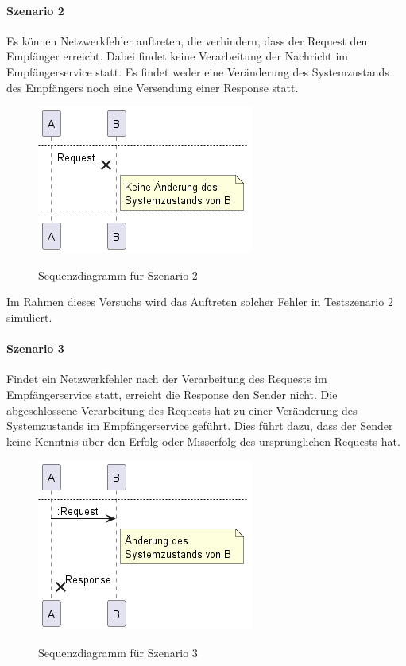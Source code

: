 \paragraph*{Szenario 2}
Es können Netzwerkfehler auftreten, die verhindern, dass der Request den Empfänger erreicht. Dabei findet keine Verarbeitung der Nachricht im Empfängerservice statt. Es findet weder eine Veränderung des Systemzustands des Empfängers noch eine Versendung einer Response statt.

\begin{figure}[H]
	\centering
	\includegraphics[width=.4\linewidth]{figures/ChapterVersuchsvorbereitung/TestSzenarien-1.png}
	\label{fig:Testszenario2}
	\caption{Sequenzdiagramm für Szenario 2}
\end{figure}
\FloatBarrier

Im Rahmen dieses Versuchs wird das Auftreten solcher Fehler in Testszenario 2 simuliert. 

\paragraph*{Szenario 3}
Findet ein Netzwerkfehler nach der Verarbeitung des Requests im Empfängerservice statt, erreicht die Response den Sender nicht. Die abgeschlossene Verarbeitung des Requests hat zu einer Veränderung des Systemzustands im Empfängerservice geführt. Dies führt dazu, dass der Sender keine Kenntnis über den Erfolg oder Misserfolg des ursprünglichen Requests hat.

\begin{figure}[H]
	\centering
	\includegraphics[width=.4\linewidth]{figures/ChapterVersuchsvorbereitung/TestSzenarien-2.png}
	\label{fig:Testszenario3}
	\caption{Sequenzdiagramm für Szenario 3}
\end{figure}
\FloatBarrier

